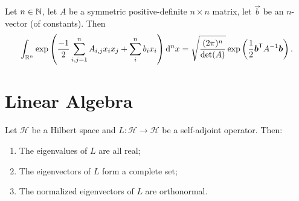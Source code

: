 \begin{theorem}
Let $n\in\mathbb{N}$, let $A$ be a symmetric positive-definite $n\times n$ matrix,
let $\vec{b}$ be an $n$-vector (of constants).
Then
\begin{equation*}
\int_{\mathbb{R}^{n}}\exp\left(\frac{-1}{2}\sum^{n}_{i,j=1}A_{i,j}x_{i}x_{j}+\sum^{n}_{i}b_{i}x_{i}\right)\mathrm{d}^{n}x
=\sqrt{\frac{(2\pi)^{n}}{\det(A)}}\exp\left(\frac{1}{2}\boldsymbol{b}^{\mathsf{T}}A^{-1}\boldsymbol{b}\right).
\end{equation*}
\end{theorem}

\section{Linear Algebra}

\begin{theorem}
Let $\mathcal{H}$ be a Hilbert space and $L\colon \mathcal{H}\to\mathcal{H}$
be a self-adjoint operator. Then:
\begin{enumerate}
\item The eigenvalues of $L$ are all real;
\item The eigenvectors of $L$ form a complete set;
\item The normalized eigenvectors of $L$ are orthonormal.
\end{enumerate}
\end{theorem}